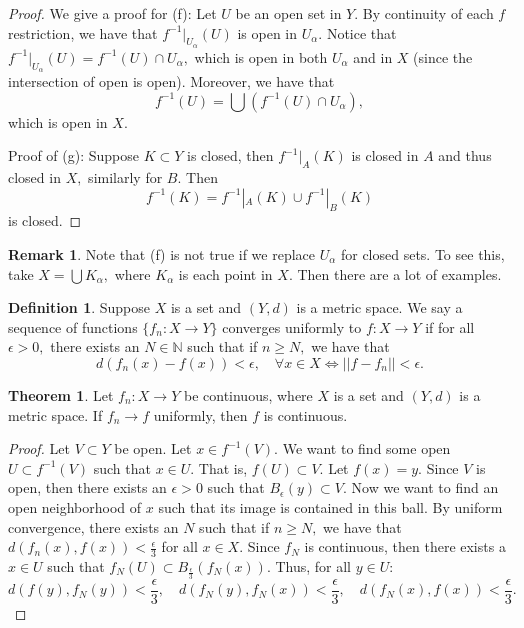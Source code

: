 \documentclass[10pt, oneside]{article}
\newcommand{\bbN}{\mathbb{N}}
\theoremstyle{definition}
\newtheorem{thm}{Theorem}
\newtheorem{defn}{Definition}
\newtheorem{rem}{Remark}
\begin{document}
\begin{proof}
    We give a proof for (f): Let $U$ be an open set in $Y.$ By continuity of each $f$ restriction, we have that $f^{-1}|_{U_\alpha}(U)$ is open in $U_\alpha.$
    Notice that $f^{-1}|_{U_\alpha}(U) = f^{-1}(U) \cap U_\alpha,$ which is open in both $U_\alpha$ and in $X$ (since the intersection of open is open). Moreover, we have that 
    \[f^{-1}(U) = \bigcup(f^{-1}(U) \cap U_\alpha),\] which is open in $X.$

    Proof of (g): Suppose $K\subset Y$ is closed, then $f^{-1}|_A(K)$ is closed in $A$ and thus closed in $X,$ similarly for $B.$ Then 
    \[f^{-1}(K) = f^{-1}|_A(K) \cup f^{-1}|_B (K)\] is closed.
\end{proof}
\begin{rem}
    Note that (f) is not true if we replace $U_\alpha$ for closed sets. To see this, take $X = \bigcup K_\alpha,$ where $K_\alpha$ is each point in $X.$ Then there are a lot of examples.
\end{rem}
\begin{defn}
    Suppose $X$ is a set and $(Y,d)$ is a metric space. We say a sequence of functions $\{f_n : X\to Y\}$ converges uniformly to $f: X\to Y$ if for all $\epsilon>0,$ there exists an $N\in \bbN$ such that  if $n\geq N,$ we have that 
    \[d(f_n(x) - f(x))< \epsilon, \quad \forall x\in X \iff ||f - f_n|| < \epsilon.\]
\end{defn}
\begin{thm}
    Let $f_n: X\to Y$ be continuous, where $X$ is a set and $(Y,d)$ is a metric space. If $f_n \to f$ uniformly, then $f$ is continuous.
\end{thm}
\begin{proof}
    Let $V\subset Y$ be open. Let $x\in f^{-1}(V).$ We want to find some open $U\subset f^{-1}(V)$ such that $x\in U.$ That is, $f(U)\subset V.$ Let $f(x) = y.$  Since $V$ is open, then there exists an $\epsilon>0$ such that $B_\epsilon(y)\subset V.$ Now we want to find an open neighborhood of $x$ such that its image is contained in this ball. By uniform convergence, there exists an $N$ such that if $n\geq N,$ we have that $d(f_n(x), f(x))< \frac{\epsilon}{3}$ for all $x\in X.$ Since $f_N$ is continuous, then there exists a $x\in U$ such that $f_N(U)\subset B_\frac{\epsilon}{3}(f_N(x)).$ Thus, for all $y\in U:$
    \[d(f(y), f_N(y))< \frac{\epsilon}{3}, \quad d(f_N(y), f_N(x)) < \frac{\epsilon}{3}, \quad d(f_N(x), f(x))< \frac{\epsilon}{3}.\]
\end{proof}
\end{document}
